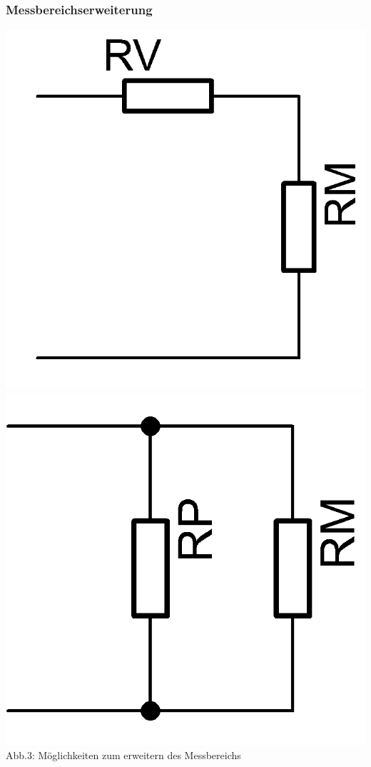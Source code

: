 \begin{frame}
	\frametitle{Messbereichserweiterung}
	\includegraphics[scale=2]{a16/Messbereichserweiterung-Spannung.png}
	\hspace{3mm}
	\includegraphics[scale=2]{a16/Messbereichserweiterung-Strom.png}\\
	Abb.3: Möglichkeiten zum erweitern des Messbereichs	
\end{frame}

